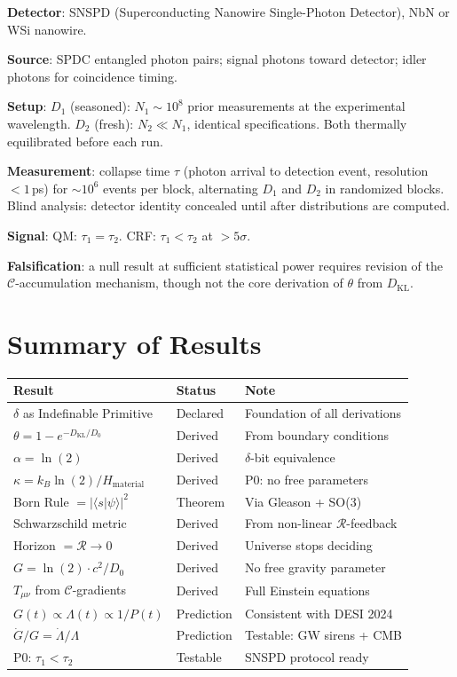 \documentclass[12pt]{article}
\begin{document}
\textbf{Detector}: SNSPD (Superconducting Nanowire Single-Photon
Detector), NbN or WSi nanowire.

\textbf{Source}: SPDC entangled photon pairs; signal photons toward
detector; idler photons for coincidence timing.

\textbf{Setup}: $D_1$ (seasoned): $N_1 \sim 10^8$ prior
measurements at the experimental wavelength.
$D_2$ (fresh): $N_2 \ll N_1$, identical specifications.
Both thermally equilibrated before each run.

\textbf{Measurement}: collapse time $\tau$ (photon arrival to
detection event, resolution $<1$\,ps) for $\sim 10^6$ events per
block, alternating $D_1$ and $D_2$ in randomized blocks.
Blind analysis: detector identity concealed until after
distributions are computed.

\textbf{Signal}: QM: $\tau_1 = \tau_2$.
CRF: $\tau_1 < \tau_2$ at $>5\sigma$.

\textbf{Falsification}: a null result at sufficient statistical
power requires revision of the $\mathcal{C}$-accumulation
mechanism, though not the core derivation of $\theta$ from
$D_{\mathrm{KL}}$.

\section{Summary of Results}

\begin{center}
\renewcommand{\arraystretch}{1.6}
\begin{tabular}{p{5.5cm} p{2.2cm} p{4.5cm}}
\toprule
\textbf{Result} & \textbf{Status} & \textbf{Note} \\
\midrule
$\delta$ as Indefinable Primitive
  & Declared & Foundation of all derivations \\
$\theta = 1 - e^{-D_{\mathrm{KL}}/D_0}$
  & Derived & From boundary conditions \\
$\alpha = \ln(2)$
  & Derived & $\delta$-bit equivalence \\
$\kappa = k_B\ln(2)/H_{\mathrm{material}}$
  & Derived & P0: no free parameters \\
Born Rule $= |\langle s|\psi\rangle|^2$
  & Theorem & Via Gleason + SO(3) \\
Schwarzschild metric
  & Derived & From non-linear $\mathcal{R}$-feedback \\
Horizon $= \mathcal{R} \to 0$
  & Derived & Universe stops deciding \\
$G = \ln(2)\cdot c^2/D_0$
  & Derived & No free gravity parameter \\
$T_{\mu\nu}$ from $\mathcal{C}$-gradients
  & Derived & Full Einstein equations \\
$G(t) \propto \Lambda(t) \propto 1/P(t)$
  & Prediction & Consistent with DESI 2024 \\
$\dot{G}/G = \dot{\Lambda}/\Lambda$
  & Prediction & Testable: GW sirens + CMB \\
P0: $\tau_1 < \tau_2$
  & Testable & SNSPD protocol ready \\
\bottomrule
\end{tabular}
\end{center}
\end{document}
